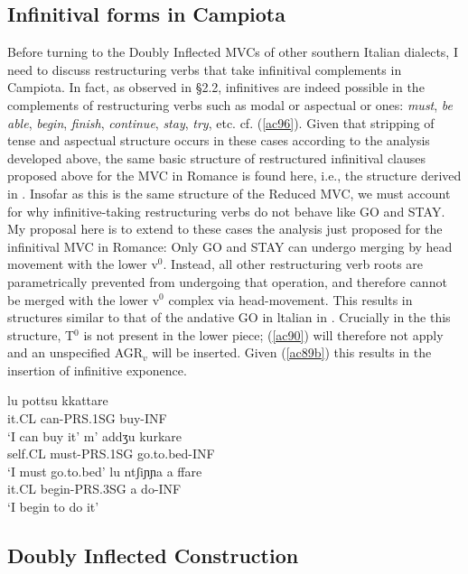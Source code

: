 \documentclass[output=paper]{langscibook}
\begin{document}
\subsection{Infinitival forms in Campiota}

Before turning to the Doubly Inflected MVCs of other southern Italian dialects, I need to discuss restructuring verbs that take infinitival complements in Campiota. In fact, as observed in §2.2, infinitives are indeed possible in the complements of restructuring verbs such as modal or aspectual or ones: \textit{must},\textit{ be  able},  \textit{begin},  \textit{finish},  \textit{continue},  \textit{stay},  \textit{try}, etc. cf. (\ref{ac96}). Given that stripping of tense and aspectual structure occurs in these cases according to the analysis developed above, the same basic structure of restructured infinitival clauses proposed above for the MVC in Romance is found here, i.e., the structure derived in . Insofar as this is the same structure of the Reduced MVC, we must account for why infinitive-taking restructuring verbs do not behave like GO and STAY. My proposal here is to extend to these cases the analysis just proposed for the infinitival MVC in Romance: Only GO and STAY can undergo merging  by  head  movement  with  the  lower  v$^0$.  Instead, all other restructuring verb roots are parametrically prevented from undergoing that operation, and therefore cannot be merged with the lower v$^0$ complex via head-movement. This results in structures similar to that of the andative GO in ltalian in . Crucially in the this structure, T$^0$ is not present in the lower piece; (\ref{ac90}) will therefore not apply and an unspecified AGR$_v$ will be inserted.  Given (\ref{ac89b}) this results in the insertion of infinitive exponence.

\ea \label{ac96}
    \ea \gll lu      pottsu     kkattare\\
    it.CL can-PRS.1SG buy-INF\\
    \glt `I can buy it'
    \ex \gll m’    addʒu      kurkare\\
    self.CL  must-PRS.1SG   go.to.bed-INF \\
    \glt `I must go.to.bed'
    \ex \gll lu ntʃiɲɲa       a  ffare\\
    it.CL begin-PRS.3SG a  do-INF \\
    \glt `I begin to do it'
    \z
\z

\subsection{Doubly Inflected Construction}
\end{document}
